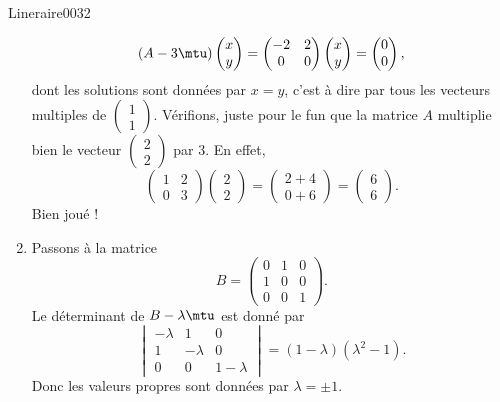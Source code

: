 \begin{corrige}{Lineraire0032}
\begin{enumerate}
\begin{equation}
		(A-3\mtu)\begin{pmatrix}
			x	\\ 
			y	
		\end{pmatrix}=\begin{pmatrix}
			-2	&	2	\\ 
			0	&	0	
		\end{pmatrix}\begin{pmatrix}
			x	\\ 
			y	
		\end{pmatrix}=\begin{pmatrix}
			0	\\ 
			0	
		\end{pmatrix},
	\end{equation}
	dont les solutions sont données par $x=y$, c'est à dire par tous les vecteurs multiples de $\begin{pmatrix}
		1	\\ 
		1	
	\end{pmatrix}$. Vérifions, juste pour le fun que la matrice $A$ multiplie bien le vecteur $\begin{pmatrix}
		2	\\ 
		2	
	\end{pmatrix}$ par $3$. En effet,
	\begin{equation}
		\begin{pmatrix}
			1	&	2	\\ 
			0	&	3	
		\end{pmatrix}\begin{pmatrix}
			2	\\ 
			2	
		\end{pmatrix}=\begin{pmatrix}
			2+4	\\ 
			0+6	
		\end{pmatrix}=\begin{pmatrix}
			6	\\ 
			6	
		\end{pmatrix}.
	\end{equation}
	Bien joué !
\item
	Passons à la matrice
	\begin{equation}
		B=\begin{pmatrix}
			0	&	1	&	0	\\
			1	&	0	&	0	\\
			0	&	0	&	1
		\end{pmatrix}.
	\end{equation}
	Le déterminant de $B-\lambda\mtu$ est donné par
	\begin{equation}
		\begin{vmatrix}
			-\lambda	&	1	&	0	\\
			1	&	-\lambda	&	0	\\
			0	&	0	&	1-\lambda
		\end{vmatrix}=(1-\lambda)(\lambda^2-1).
	\end{equation}
	Donc les valeurs propres sont données par $\lambda=\pm 1$.


\end{enumerate}
\end{corrige}
